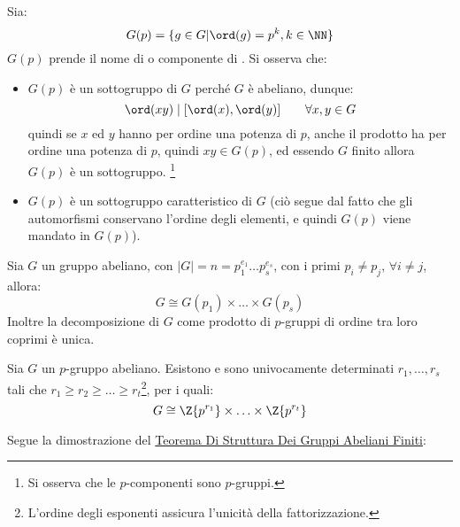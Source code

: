 \documentclass[11pt]{scrartcl}
\begin{document}
\begin{remark}
    Sia:
        \[ G(p) = \{g \in G | \ord(g) = p^k, k \in \NN\}
            \]
    $G(p)$ prende il nome di  o componente di .
    Si osserva che:
        \begin{itemize}
            \item $G(p)$ è un sottogruppo di $G$ perché $G$ è abeliano, dunque:
                \[ \ord(xy) \mid [\ord(x),\ord(y)] \qquad \forall x,y \in G
                    \]
                quindi se $x$ ed $y$ hanno per ordine una potenza di $p$, anche il prodotto ha per ordine una potenza di $p$, quindi $xy \in G(p)$, ed essendo 
                $G$ finito allora $G(p)$ è un sottogruppo. \footnote{Si osserva che le $p$-componenti sono $p$-gruppi.}
            \item $G(p)$ è un sottogruppo caratteristico di $G$ (ciò segue dal fatto che gli automorfismi conservano l'ordine degli elementi, e quindi $G(p)$ viene mandato in $G(p)$).
        \end{itemize}
\end{remark}

\begin{theorem}
    \label{t:t1}
    Sia $G$ un gruppo abeliano, con $|G| = n = p_1^{e_1}\ldots p_s^{e_s}$, con i primi $p_i \ne p_j$, $\forall i \ne j$, allora:
        \[ G \cong G(p_1) \times \ldots \times G(p_s)
            \]
    Inoltre la decomposizione di $G$ come prodotto di $p$-gruppi di ordine tra loro coprimi è unica.
\end{theorem}

\begin{theorem}
    \label{t:t2}
    Sia $G$ un $p$-gruppo abeliano. Esistono e sono univocamente determinati $r_1,\ldots,r_s$ tali che $r_1 \geq r_2 \geq \ldots \geq r_t$\footnote{L'ordine
     degli esponenti assicura l'unicità della fattorizzazione.}, per i quali:
        \[ G \cong \Z{p^{r_1}} \times \ldots \times \Z{p^{r_t}}
            \]
\end{theorem}

\pagebreak

Segue la dimostrazione del \hyperref[t:struttura]{Teorema Di Struttura Dei Gruppi Abeliani Finiti}:
\end{document}
